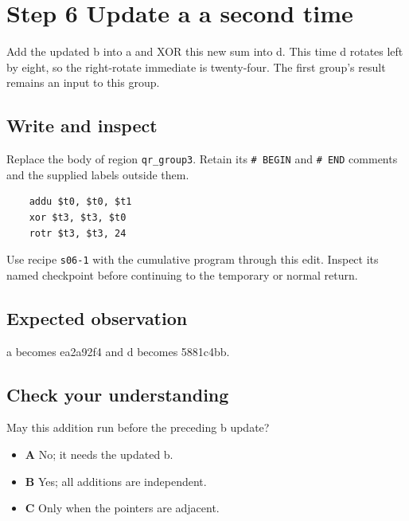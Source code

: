 \section{Step 6 Update a a second time}\label{chacha-s06}

Add the updated b into a and XOR this new sum into d. This time d rotates left by eight, so the right-rotate immediate is twenty-four. The first group's result remains an input to this group.

\subsection{Write and inspect}
Replace the body of region \texttt{qr\_group3}. Retain its \texttt{\# BEGIN} and \texttt{\# END} comments and the supplied labels outside them.

\begin{verbatim}
    addu $t0, $t0, $t1
    xor $t3, $t3, $t0
    rotr $t3, $t3, 24
\end{verbatim}

Use recipe \texttt{s06-1} with the cumulative program through this edit. Inspect its named checkpoint before continuing to the temporary or normal return.

\subsection{Expected observation}
a becomes ea2a92f4 and d becomes 5881c4bb.

\subsection{Check your understanding}
May this addition run before the preceding b update?

\begin{itemize}
  \item \textbf{A} No; it needs the updated b.
  \item \textbf{B} Yes; all additions are independent.
  \item \textbf{C} Only when the pointers are adjacent.
\end{itemize}
